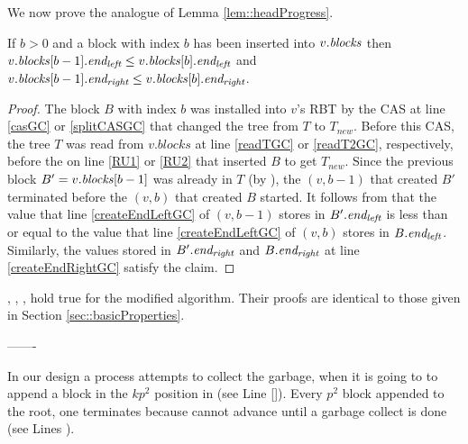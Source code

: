 We now prove the analogue of Lemma \ref{lem::headProgress}.
\begin{lemma}
 If $b>0$ and a block with index $b$ has been inserted into $v.\mbox{\textit{blocks}}$ then 
 $v.\mbox{\textit{blocks}}[b-1].\mbox{\textit{end\textsubscript{left}}} \leq v.\mbox{\textit{blocks}}[b].\mbox{\textit{end\textsubscript{left}}}$ and 
 $v.\mbox{\textit{blocks}}[b-1].\mbox{\textit{end\textsubscript{right}}} \leq v.\mbox{\textit{blocks}}[b].\mbox{\textit{end\textsubscript{right}}}$.
\end{lemma}
\begin{proof}
The block $B$ with index $b$ was installed into $v$'s RBT by the CAS at line \ref{casGC} or \ref{splitCASGC} 
that changed the tree from $T$ to $T_{new}$.
Before this CAS, the tree $T$ was read from $v.blocks$ at line \ref{readTGC} or \ref{readT2GC}, respectively,
before the  on line \ref{RU1} or \ref{RU2} that inserted $B$ to get $T_{new}$.
Since the previous block $B'=v.\mbox{\textit{blocks}}[b-1]$ was already in $T$ (by ),
the $(v,b-1)$ that created $B'$ terminated before the $(v,b)$ that created $B$ started.
It follows from  that the value that line \ref{createEndLeftGC} of $(v,b-1)$ stores in $B'.\mbox{\textit{end\textsubscript{left}}}$ is less than or equal to the value that line \ref{createEndLeftGC} of $(v,b)$ stores in $B.\mbox{\textit{end\textsubscript{left}}}$.  Similarly, the values stored in $B'.\mbox{\textit{end\textsubscript{right}}}$ and $B.\mbox{\textit{end\textsubscript{right}}}$ at line \ref{createEndRightGC} satisfy the claim.
\end{proof}

, , ,  hold true for the modified algorithm.  Their proofs are identical to those given in Section \ref{sec::basicProperties}.








-------

In our design a process attempts to collect the garbage, when it is going to to append a block in the $kp^2$ position in  (see Line \ref{}). Every $p^2$  block appended to the root, one  terminates because  cannot advance until a  garbage collect is done (see Lines ).

%

